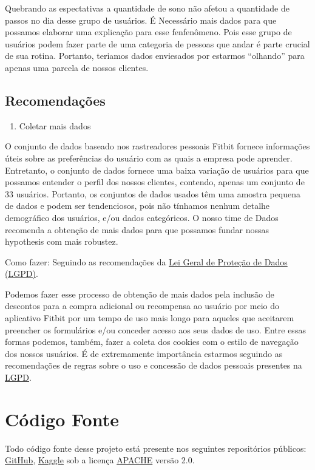 Quebrando as espectativas a quantidade de sono não afetou a quantidade
de passos no dia desse grupo de usuários. É Necessário mais dados para
que possamos elaborar uma explicação para esse fenfenômeno. Pois esse
grupo de usuários podem fazer parte de uma categoria de pessoas que
andar é parte crucial de sua rotina. Portanto, teriamos dados enviesados
por estarmos ``olhando'' para apenas uma parcela de nossos clientes.

\subsection{Recomendações}

\begin{enumerate}
    \def\labelenumi{\arabic{enumi}.}
    \tightlist
    \item
          Coletar mais dados
\end{enumerate}

O conjunto de dados baseado nos rastreadores pessoais Fitbit fornece
informações úteis sobre as preferências do usuário com as quais a
empresa pode aprender. Entretanto, o conjunto de dados fornece uma baixa
variação de usuários para que possamos entender o perfil dos nossos
clientes, contendo, apenas um conjunto de 33 usuários. Portanto, os
conjuntos de dados usados têm uma amostra pequena de dados e podem ser
tendenciosos, pois não tínhamos nenhum detalhe demográfico dos usuários,
e/ou dados categóricos. O nosso time de Dados recomenda a obtenção de
mais dados para que possamos fundar nossas hypothesis com mais robustez.

Como fazer: Seguindo as recomendações da
\href{https://www.bndes.gov.br/wps/portal/site/home/transparencia/lgpd}{Lei
    Geral de Proteção de Dados (LGPD)}.


Podemos fazer esse processo de obtenção de mais dados pela inclusão de descontos para a compra adicional ou recompensa ao usuário por meio do aplicativo Fitbit por um tempo de uso mais longo para aqueles que aceitarem preencher os formulários e/ou conceder acesso aos seus dados de uso. Entre essas formas podemos, também, fazer a coleta dos cookies com o estilo de navegação dos nossos usuários.
É de extremamente importância estarmos seguindo as recomendações de regras sobre o uso e concessão de dados pessoais presentes na \href{https://www.bndes.gov.br/wps/portal/site/home/transparencia/lgpd}{LGPD}.

\section{Código Fonte}

Todo código fonte desse projeto está presente nos seguintes repositórios públicos: \href{https://github.com/ARRETdaniel/22-2E_topicos_Especiais_em_IA_II_Sistemas_Inteligentes/tree/master/projectFinal}{GitHub}, \href{https://www.kaggle.com/code/arretdaniel/finalproject-fitbit-fitness-data}{Kaggle} sob a licença  \href{https://www.apache.org/licenses/LICENSE-2.0}{APACHE} versão 2.0.
